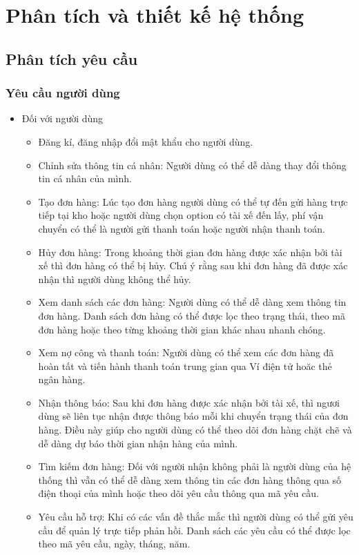 \chapter{Phân tích và thiết kế hệ thống}

\section{Phân tích yêu cầu}
    \subsection{Yêu cầu người dùng}
    	\begin{itemize}
				\item Đối với người dùng
					\begin{itemize}
				        \item Đăng kí, đăng nhập đổi mật khẩu cho người dùng.
				        \item Chỉnh sửa thông tin cá nhân: Người dùng có thể dễ dàng thay đổi thông tin cá nhân của mình.
				        \item Tạo đơn hàng: Lúc tạo đơn hàng người dùng có thể tự đến gửi hàng trực tiếp tại kho hoặc người dùng chọn option có tài xế đến lấy, phí vận chuyển có thể là người gửi thanh toán hoặc người nhận thanh toán.
				        \item Hủy đơn hàng: Trong khoảng thời gian đơn hàng được xác nhận bởi tài xế thì đơn hàng có thể bị hủy. Chú ý rằng sau khi đơn hàng đã được xác nhận thì người dùng không thể hủy.
				        \item Xem danh sách các đơn hàng: Người dùng có thể dễ dàng xem thông tin đơn hàng. Danh sách đơn hàng có thể được lọc theo trạng thái, theo mã đơn hàng hoặc theo từng khoảng thời gian khác nhau nhanh chóng.
				        \item Xem nợ công và thanh toán: Người dùng có thể xem các đơn hàng đã hoàn tất và tiến hành thanh toán trung gian qua Ví điện tử hoăc thẻ ngân hàng.
				        \item Nhận thông báo: Sau khi đơn hàng được xác nhận bởi tài xế, thì ngươi dùng sẽ liên tục nhận được thông báo mỗi khi chuyển trạng thái của đơn hàng. Điều này giúp cho người dùng có thể theo dõi đơn hàng chặt chẽ và dễ dàng dự báo thời gian nhận hàng của mình.
				        \item Tìm kiếm đơn hàng: Đối với người nhận không phải là người dùng của hệ thống thì vẫn có thể dễ dàng xem thông tin các đơn hàng thông qua số điện thoại của mình hoặc theo dõi yêu cầu thông qua mã yêu cầu.
				        \item Yêu cầu hỗ trợ: Khi có các vấn đề thắc mắc thì người dùng có thể gửi yêu cầu để quản lý trực tiếp phản hồi. Danh sách các yêu cầu có thể được lọc theo mã yêu cầu, ngày, tháng, năm.
				        

\end{itemize}
\end{itemize}
